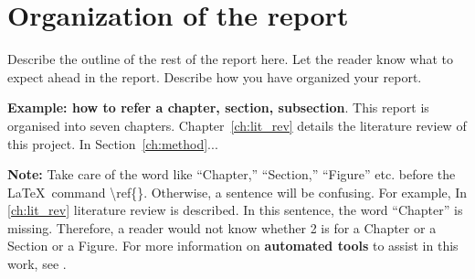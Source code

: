 \section{Organization of the report} %
\label{sec:intro_org} %
Describe the outline of the rest of the report here. Let the reader know what to expect ahead in the report. Describe how you have organized your report. 

\textbf{Example: how to refer a chapter, section, subsection}. This report is organised into seven chapters. Chapter~\ref{ch:lit_rev} details the literature review of this project. In Section~\ref{ch:method}...  %

\textbf{Note:}  Take care of the word like ``Chapter,'' ``Section,'' ``Figure'' etc. before the \LaTeX~command \textbackslash ref\{\}. Otherwise, a  sentence will be confusing. For example, In \ref{ch:lit_rev} literature review is described. In this sentence, the word ``Chapter'' is missing. Therefore, a reader would not know whether 2 is for a Chapter or a Section or a Figure.  For more information on \textbf{automated tools} to assist in this work, see .

